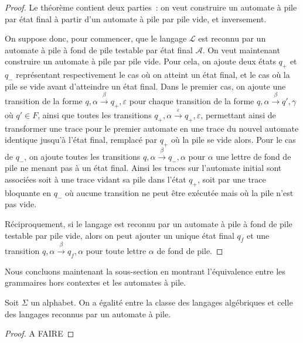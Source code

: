 \begin{proof}
    Le théorème contient deux parties~: on veut construire un automate à pile par état
    final à partir d'un automate à pile par pile vide, et inversement.

    On suppose donc, pour commencer, que le langage $\mathcal L$ est reconnu par un
    automate à pile à fond de pile testable par état final $\mathcal A$. On veut
    maintenant construire un automate à pile par pile vide. Pour cela, on ajoute deux
    états $q_+$ et $q_-$ représentant respectivement le cas où on atteint un état final,
    et le cas où la pile se vide avant d'atteindre un état final. Dans le premier cas,
    on ajoute une transition de la forme
    $q,\alpha\xrightarrow \beta q_+,\varepsilon$ pour chaque transition de la forme
    $q,\alpha\xrightarrow \beta q',\gamma$ où $q' \in F$, ainsi que toutes les
    transitions $q_+,\alpha \xrightarrow\varepsilon q_+,\varepsilon$, permettant ainsi
    de transformer une trace pour le premier automate en une trace du nouvel automate
    identique jusqu'à l'état final, remplacé par $q_+$ où la pile se vide alors.
    Pour le cas de $q_-$, on ajoute toutes les transitions
    $q,\alpha \xrightarrow \beta q_-,\alpha$ pour $\alpha$ une lettre de fond de
    pile ne menant pas à un état final. Ainsi les traces sur l'automate initial sont
    associées soit à une trace vidant sa pile dans l'état $q_+$, soit par une
    trace bloquante en $q_-$ où aucune transition ne peut être exécutée mais où la
    pile n'est pas vide.

    Réciproquement, si le langage est reconnu par un automate à pile à fond de pile
    testable par pile vide, alors on peut ajouter un unique état final $q_f$ et une
    transition $q,\alpha\xrightarrow\beta q_f,\alpha$ pour toute lettre $\alpha$
    de fond de pile.
\end{proof}

Nous concluons maintenant la sous-section en montrant l'équivalence entre les
grammaires hors contextes et les automates à pile.

\begin{theorem}
    Soit $\Sigma$ un alphabet. On a égalité entre la classe des langages algébriques
    et celle des langages reconnus par un automate à pile.
\end{theorem}

\begin{proof}
    A FAIRE
\end{proof}